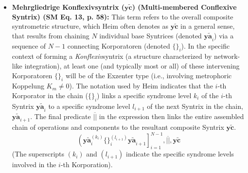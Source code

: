 \documentclass[12pt]{article}
\newcommand{\syntrix}{\bm{y\widetilde{a}}}
\newcommand{\konflexivsyntrix}{\bm{y\widetilde{c}}}
\begin{document}
\begin{itemize}
    \item \textbf{Mehrgliedrige Konflexivsyntrix (\(\konflexivsyntrix\)) (Multi-membered Conflexive Syntrix) (SM Eq. 13, p. 58):}
    This term refers to the overall composite syntrometric structure, which Heim often denotes as \( \konflexivsyntrix \) in a general sense, that results from chaining \( N \) individual base Syntrices (denoted \( \syntrix_i \)) via a sequence of \( N-1 \) connecting Korporatoren (denoted \( \{ \}_i \)). In the specific context of forming a \textit{Konflexiv}syntrix (a structure characterized by network-like integration), at least one (and typically most or all) of these intervening Korporatoren \( \{ \}_i \) will be of the Exzenter type (i.e., involving metrophoric Koppelung \(K_m \neq 0\)). The notation used by Heim indicates that the \( i \)-th Korporator in the chain (\( \{ \}_i \)) links a specific syndrome level \( k_i \) of the \(i\)-th Syntrix \( \syntrix_i \) to a specific syndrome level \( l_{i+1} \) of the next Syntrix in the chain, \( \syntrix_{i+1} \). The final predicate \( \overline{||} \) in the expression then links the entire assembled chain of operations and components to the resultant composite Syntrix \( \konflexivsyntrix \).
    \begin{equation}
    \left( \syntrix_i^{(k_i)} \{ \}_i^{(l_{i+1})} \syntrix_{i+1} \right]_{i=1}^{N-1}, \overline{||}, \konflexivsyntrix
    \label{eq:mehrgliedrige_konflexivsyntrix_original}
    \end{equation}
    (The superscripts \( (k_i) \) and \( (l_{i+1}) \) indicate the specific syndrome levels involved in the \(i\)-th Korporation).


\end{itemize}
\end{document}
